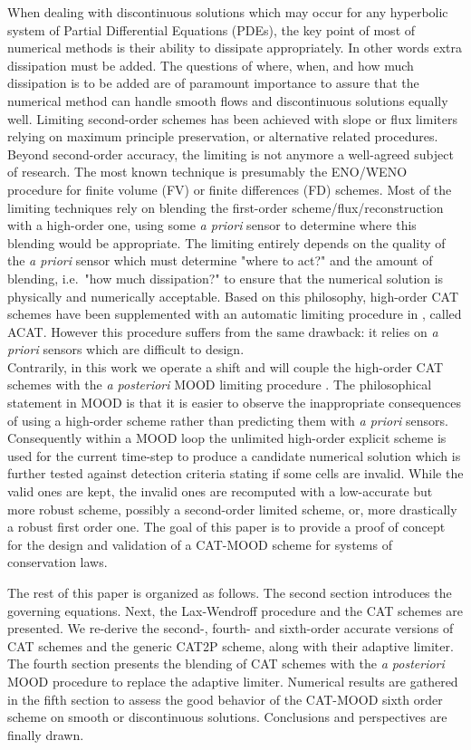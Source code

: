 \documentclass[3p,times]{elsarticle}
\newcommand{\raphael}{\textcolor{ForestGreen}}
\begin{document}
When dealing with discontinuous solutions which may occur for any hyperbolic system of Partial Differential Equations (PDEs), the key point of most of numerical methods is their ability to dissipate appropriately. In other words extra dissipation must be added. The questions of where, when, and how much dissipation is to be added are of paramount importance to assure that the numerical method can handle smooth flows and discontinuous solutions equally well.
Limiting second-order schemes has been achieved with slope or flux limiters relying on maximum principle preservation, or alternative related procedures. 
Beyond second-order accuracy, the limiting is not anymore a well-agreed subject of research. The most known technique is presumably the ENO/WENO procedure \cite{Shu1} for finite volume (FV) or finite differences (FD) schemes. Most of the limiting techniques rely on blending the first-order scheme/flux/reconstruction with a high-order one, using some \textit{a priori} sensor to determine where this blending would be appropriate.
The limiting entirely depends on the 
quality of the \textit{a priori} sensor which must determine "where to act?" and the amount of blending, i.e.\ "how much dissipation?" to ensure that the numerical solution is physically and numerically acceptable.
Based on this philosophy, high-order CAT schemes have been supplemented with an automatic limiting procedure in \cite{Macca-Pares}, called ACAT.
However this procedure suffers from the same drawback: it relies on \textit{a priori} sensors which are difficult to design. \\
Contrarily, in this work we operate a shift and will couple the high-order CAT schemes with the \textit{a posteriori} MOOD limiting procedure \cite{CDL1,CDL2,CDL3}. 
The philosophical statement in MOOD is that it is easier to observe the inappropriate consequences of using a high-order scheme rather than predicting them with \textit{a priori} sensors. Consequently within a MOOD loop the unlimited high-order explicit scheme is used for the current time-step to produce a candidate numerical solution which is further tested against detection criteria stating if some cells are invalid. While the valid ones are kept, the invalid ones are recomputed with a low-accurate but more robust scheme, possibly a second-order limited scheme, or, more drastically a robust first order one.
The goal of this paper is to provide a proof of concept for the design and validation of a CAT-MOOD scheme for systems of conservation laws.

The rest of this paper is organized as follows. 
The second section introduces the governing equations.
Next, the Lax-Wendroff procedure and the CAT schemes are presented.
We re-derive the second-, fourth- and sixth-order accurate versions of CAT schemes
and the generic CAT2P scheme, along with their adaptive limiter.
The fourth section presents the blending of CAT schemes with the \textit{a posteriori} MOOD procedure to replace the adaptive limiter.
Numerical results are gathered in the fifth section to assess the good behavior of the CAT-MOOD sixth order scheme on smooth or discontinuous solutions.
Conclusions and perspectives are finally drawn.
\end{document}
